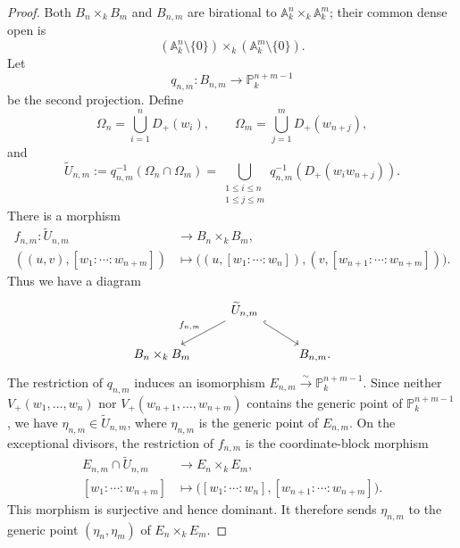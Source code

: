 \begin{proof}
Both $B_n\times_kB_m$ and $B_{n,m}$ are birational to
$\mathbb A_k^n\times_k\mathbb A_k^m$; their common dense open is
\[
    (\mathbb A_k^n\setminus\{0\})
      \times_k(\mathbb A_k^m\setminus\{0\}).
\]
Let
\[
    q_{n,m}\colon B_{n,m}
      \longrightarrow\mathbb P_k^{n+m-1}
\]
be the second projection. Define
\[
    \Omega_n=\bigcup_{i=1}^{n}D_+(w_i),
    \qquad
    \Omega_m=\bigcup_{j=1}^{m}D_+(w_{n+j}),
\]
and
\[
    \widetilde U_{n,m}
      :=q_{n,m}^{-1}(\Omega_n\cap\Omega_m)
      =\bigcup_{\substack{1\leq i\leq n\\1\leq j\leq m}}
        q_{n,m}^{-1}\!\left(D_+(w_iw_{n+j})\right).
\]
There is a morphism
\[
\begin{aligned}
f_{n,m}\colon\widetilde U_{n,m}&\longrightarrow
   B_n\times_kB_m,\\
((u,v),[w_1:\cdots:w_{n+m}])&\longmapsto
\bigl((u,[w_1:\cdots:w_n]),
      (v,[w_{n+1}:\cdots:w_{n+m}])\bigr).
\end{aligned}
\]
Thus we have a diagram
\[
\begin{tikzcd}
& \widetilde U_{n,m}
    \arrow[dl,"f_{n,m}"'] \arrow[dr,hook] & \\
B_n\times_kB_m && B_{n,m}.
\end{tikzcd}
\]
The restriction of $q_{n,m}$ induces an isomorphism
$E_{n,m}\xrightarrow{\sim}\mathbb P_k^{n+m-1}$. Since neither
$V_+(w_1,\ldots,w_n)$ nor $V_+(w_{n+1},\ldots,w_{n+m})$ contains the generic
point of $\mathbb P_k^{n+m-1}$, we have
$\eta_{n,m}\in\widetilde U_{n,m}$, where $\eta_{n,m}$ is the generic point
of $E_{n,m}$.
On the exceptional divisors, the restriction of $f_{n,m}$ is the
coordinate-block morphism
\[
\begin{aligned}
E_{n,m}\cap\widetilde U_{n,m}&\longrightarrow E_n\times_kE_m,\\
[w_1:\cdots:w_{n+m}]&\longmapsto
\bigl([w_1:\cdots:w_n],[w_{n+1}:\cdots:w_{n+m}]\bigr).
\end{aligned}
\]
This morphism is surjective and hence dominant. It therefore sends
$\eta_{n,m}$ to the generic point $(\eta_n,\eta_m)$ of $E_n\times_kE_m$.


\end{proof}
